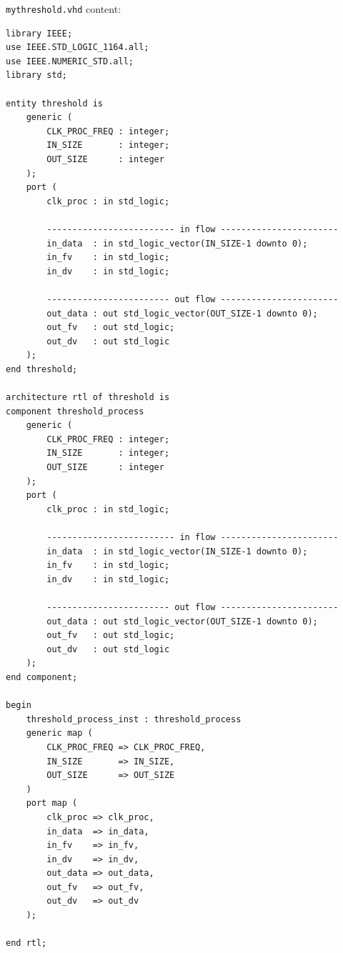 \documentclass[10pt,a4paper]{article}
\begin{document}
\texttt{mythreshold.vhd} content:
\begin{lstlisting}[frame=single]
library IEEE;
use IEEE.STD_LOGIC_1164.all;
use IEEE.NUMERIC_STD.all;
library std;

entity threshold is
	generic (
		CLK_PROC_FREQ : integer;
		IN_SIZE       : integer;
		OUT_SIZE      : integer
	);
	port (
		clk_proc : in std_logic;

		------------------------- in flow -----------------------
		in_data  : in std_logic_vector(IN_SIZE-1 downto 0);
		in_fv    : in std_logic;
		in_dv    : in std_logic;

		------------------------ out flow -----------------------
		out_data : out std_logic_vector(OUT_SIZE-1 downto 0);
		out_fv   : out std_logic;
		out_dv   : out std_logic
	);
end threshold;

architecture rtl of threshold is
component threshold_process
	generic (
		CLK_PROC_FREQ : integer;
		IN_SIZE       : integer;
		OUT_SIZE      : integer
	);
	port (
		clk_proc : in std_logic;

		------------------------- in flow -----------------------
		in_data  : in std_logic_vector(IN_SIZE-1 downto 0);
		in_fv    : in std_logic;
		in_dv    : in std_logic;

		------------------------ out flow -----------------------
		out_data : out std_logic_vector(OUT_SIZE-1 downto 0);
		out_fv   : out std_logic;
		out_dv   : out std_logic
	);
end component;

begin
	threshold_process_inst : threshold_process
    generic map (
		CLK_PROC_FREQ => CLK_PROC_FREQ,
		IN_SIZE       => IN_SIZE,
		OUT_SIZE      => OUT_SIZE
	)
    port map (
		clk_proc => clk_proc,
		in_data  => in_data,
		in_fv    => in_fv,
		in_dv    => in_dv,
		out_data => out_data,
		out_fv   => out_fv,
		out_dv   => out_dv
	);

end rtl;
\end{lstlisting}
\end{document}
